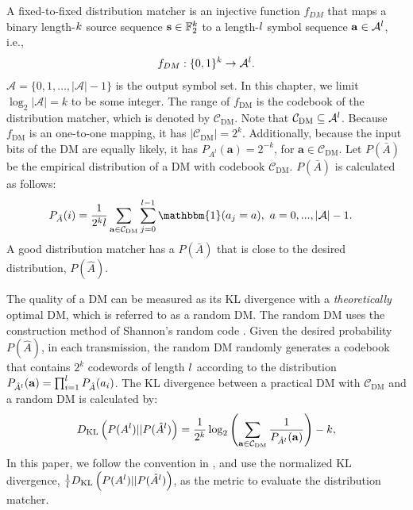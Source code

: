 \documentclass [PhD] {uclathes}
\begin{document}
A fixed-to-fixed  distribution matcher is an injective function $f_{DM}$ that maps a  binary length-$k$ source sequence $\mathbf{s}\in\mathbb{F}_2^{k}$ to a length-$l$ symbol sequence $\mathbf{a}\in\mathcal{A}^{l}$, i.e., 
\begin{align}
    f_{DM}: \{0,1\}^k\rightarrow \mathcal{A}^l.
\end{align}
$\mathcal{A}=\{0,1,\ldots,|\mathcal{A}|-1\}$ is the output symbol set. In this chapter, we limit $\log_2|\mathcal{A}|=k$ to be some integer. 
The range of $f_{\mathrm{DM}}$ is the codebook of the distribution matcher, which is denoted by $\mathcal{C}_{\mathrm{DM}}$.
Note that $ \mathcal{C}_{\mathrm{DM}}\subseteq  \mathcal{A}^l$. 
Because $f_{\mathrm{DM}}$ is an one-to-one mapping, it has $|\mathcal{C}_{\mathrm{DM}}|={2^k}$.
Additionally, because the input bits of the DM are equally likely, it has $P_{A^l}(\mathbf{a})=2^{-k}$, for $\mathbf{a}\in\mathcal{C}_{\mathrm{DM}}$.
Let $P(\bar{A})$ be the empirical distribution of a DM with codebook $\mathcal{C}_{\mathrm{DM}}$.
$P(\bar{A})$ is calculated as follows:
\begin{align}
    P_{\bar{A}}(i)&=\frac{1}{{2^\numbits\length}}\sum_{\dmou\in\mathcal{C}_{\text{DM}}}\sum_{j=0}^{\length-1}\mathbbm{1}(a_j=a),~ a=0,...,|\mathcal{A}|-1.
\end{align}
A good distribution matcher has a $P(\bar{A})$ that is close to the desired distribution, $P(\hat{A})$. 

The quality of a DM can be measured as its KL divergence with a \textit{theoretically} optimal DM, which is referred to as a random DM. The random DM uses the construction method of Shannon's random code \cite{thomas2006elements}.  Given the desired probability $P(\hat{A})$, in each transmission, the random DM randomly generates a codebook that contains $2^k$ codewords of length $l$ according to the distribution $P_{\hat{A}^l}(\mathbf{a})=\prod^{l}_{i=1}P_{\hat{A}}(a_i)$. 
The KL divergence between a practical DM with $\mathcal{C}_{\mathrm{DM}}$ and a random DM   is calculated by\cite{CCDM_schulte}: 
\begin{align} D_{\mathrm{KL}}\left(P(A^l)||P(\hat{A}^l)\right)=\frac{1}{2^k}\log_2\left(\sum_{\mathbf{a}\in\mathcal{C}_{\mathrm{DM}}}\frac{1}{P_{\hat{A}^{l}}(\mathbf{a})}\right)-k,
\end{align}
In this paper, we follow the convention in \cite{CCDM_schulte}, and use the normalized KL divergence, $\frac{1}{l}D_{\mathrm{KL}}\left(P(A^l)||P(\hat{A}^l)\right)$, as the metric to evaluate the distribution matcher.
\end{document}

